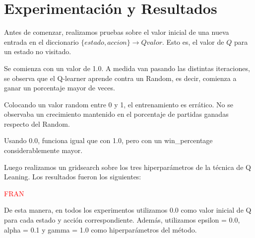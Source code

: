 \section{Experimentación y Resultados}

Antes de comenzar, realizamos pruebas sobre el valor inicial de una nueva entrada en el diccionario $\{estado, accion\} \rightarrow Q valor$. Esto es, el valor de $Q$ para un estado no visitado.

Se comienza con un valor de 1.0. A medida van pasando las distintas iteraciones, se observa que el Q-learner aprende contra un Random, es decir, comienza a ganar un porcentaje mayor de veces.

Colocando un valor random entre 0 y 1, el entrenamiento es errático. No se observaba un crecimiento mantenido en el porcentaje de partidas ganadas respecto del Random.

Usando 0.0, funciona igual que con 1.0, pero con un win\_percentage considerablemente mayor.

Luego realizamos un gridsearch sobre los tres hiperpar\'ametros de la t\'ecnica de Q Leaning. Los resultados fueron los siguientes:

\textcolor{red}{FRAN}

De esta manera, en todos los experimentos utilizamos 0.0 como valor inicial de Q para cada estado y acci\'on correspondiente. Además, utilizamos epsilon = 0.0, alpha = 0.1 y gamma = 1.0 como hiperparámetros del método.






